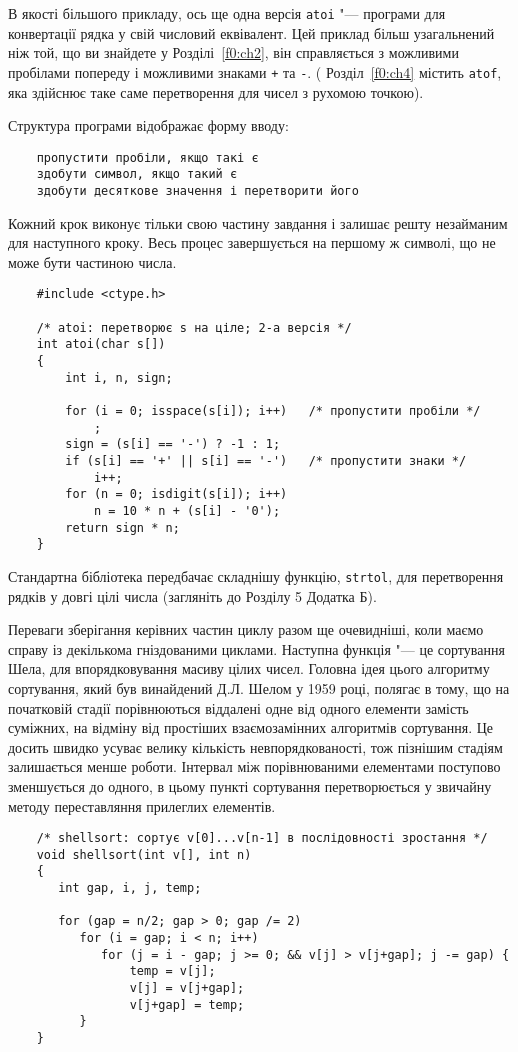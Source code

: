 \documentclass[a4paper,12pt]{book}
\begin{document}
  В якості більшого прикладу, ось ще одна версія \texttt{atoi} "--- програми для
  конвертації рядка у свій числовий еквівалент. Цей приклад більш узагальнений ніж той, що
  ви знайдете у Розділі~\ref{f0:ch2}, він справляється з можливими пробілами
  попереду і можливими знаками \texttt{+} та \texttt{-}. ( Розділ~\ref{f0:ch4}
  містить \texttt{atof}, яка здійснює таке саме перетворення для чисел з рухомою точкою).

  Структура програми відображає форму вводу:
  \begin{verbatim}
    пропустити пробіли, якщо такі є
    здобути символ, якщо такий є
    здобути десяткове значення і перетворити його
  \end{verbatim}

  Кожний крок виконує тільки свою частину завдання і залишає решту незайманим для
  наступного кроку. Весь процес завершується на першому ж символі, що не може бути
  частиною числа.
  \begin{verbatim}
    #include <ctype.h>

    /* atoi: перетворює s на ціле; 2-а версія */
    int atoi(char s[])
    {
        int i, n, sign;

        for (i = 0; isspace(s[i]); i++)   /* пропустити пробіли */
            ;
        sign = (s[i] == '-') ? -1 : 1;
        if (s[i] == '+' || s[i] == '-')   /* пропустити знаки */
            i++;
        for (n = 0; isdigit(s[i]); i++)
            n = 10 * n + (s[i] - '0');
        return sign * n;
    }
  \end{verbatim}

  Стандартна бібліотека передбачає складнішу функцію, \texttt{strtol}, для перетворення
  рядків у довгі цілі числа (загляніть до Розділу 5 Додатка Б).

  Переваги зберігання керівних частин циклу разом ще очевидніші, коли маємо справу із
  декількома гніздованими циклами. Наступна функція "--- це сортування Шела, для
  впорядковування масиву цілих чисел. Головна ідея цього алгоритму сортування, який був
  винайдений Д.Л. Шелом у 1959 році, полягає в тому, що на початковій стадії порівнюються
  віддалені одне від одного елементи замість суміжних, на відміну від простіших
  взаємозамінних алгоритмів сортування. Це досить швидко усуває велику кількість
  невпорядкованості, тож пізнішим стадіям залишається менше роботи. Інтервал між
  порівнюваними елементами поступово зменшується до одного, в цьому пункті сортування
  перетворюється у звичайну методу переставляння прилеглих елементів.
  \begin{verbatim}
    /* shellsort: сортує v[0]...v[n-1] в послідовності зростання */
    void shellsort(int v[], int n)
    {
       int gap, i, j, temp;

       for (gap = n/2; gap > 0; gap /= 2)
          for (i = gap; i < n; i++)
             for (j = i - gap; j >= 0; && v[j] > v[j+gap]; j -= gap) {
                 temp = v[j];
                 v[j] = v[j+gap];
                 v[j+gap] = temp;
          }
    }
  \end{verbatim}
\end{document}

